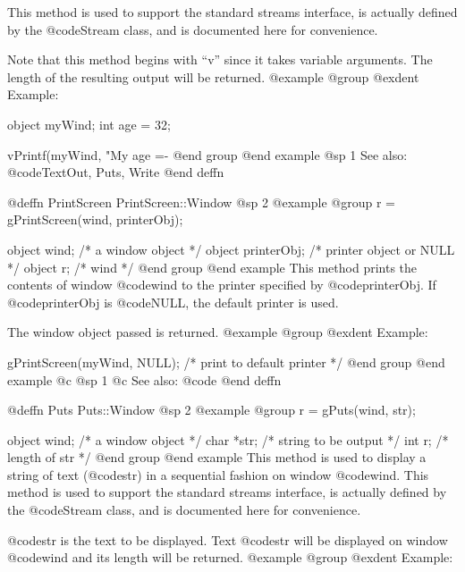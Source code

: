 This method is used to support the standard streams interface, is
actually defined by the @code{Stream} class, and is documented here for
convenience.

Note that this method begins with ``v'' since it takes variable arguments.
The length of the resulting output will be returned.
@example
@group
@exdent Example:

object  myWind;
int     age = 32;

vPrintf(myWind, "My age =- %
@end group
@end example
@sp 1
See also:  @code{TextOut, Puts, Write}
@end deffn



















@deffn {PrintScreen} PrintScreen::Window
@sp 2
@example
@group
r = gPrintScreen(wind, printerObj);

object  wind;        /*  a window object           */
object  printerObj;  /*  printer object or NULL     */
object  r;           /*  wind                      */
@end group
@end example
This method prints the contents of window @code{wind} to the printer
specified by @code{printerObj}.  If @code{printerObj} is @code{NULL},
the default printer is used.

The window object passed is returned.
@example
@group
@exdent Example:

gPrintScreen(myWind, NULL);  /* print to default printer */
@end group
@end example
@c @sp 1
@c See also:  @code{}
@end deffn




@deffn {Puts} Puts::Window
@sp 2
@example
@group
r = gPuts(wind, str);

object   wind;  /*  a window object       */
char    *str;   /*  string to be output   */
int      r;     /*  length of str         */
@end group
@end example
This method is used to display a string of text (@code{str}) in a sequential
fashion on window @code{wind}.  This method is used to support the standard
streams interface, is actually defined by the @code{Stream} class, and
is documented here for convenience.

@code{str} is the text to be displayed. Text @code{str} will be
displayed on window @code{wind} and its length will be returned.
@example
@group
@exdent Example:

